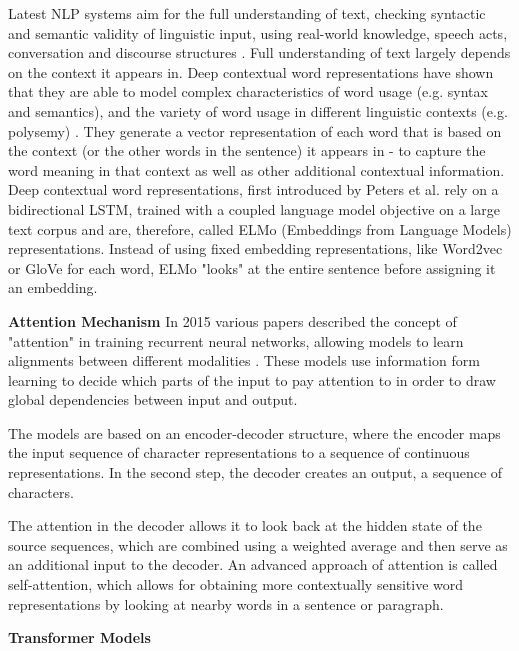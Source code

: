 Latest NLP systems aim for the full understanding of text, checking syntactic and semantic validity of linguistic input, using real-world knowledge, speech acts, conversation and discourse structures \cite{kumar2011natural}.
Full understanding of text largely depends on the context it appears in. 
Deep contextual word representations have shown that they are able to model complex characteristics of word usage (e.g. syntax and semantics), and the variety of word usage in different linguistic contexts (e.g. polysemy) \cite{peters2018deep}. They generate a vector representation of each word that is based on the context (or the other words in the sentence) it appears in - to capture the word meaning in that context as well as other additional contextual information. Deep contextual word representations, first introduced by Peters et al. rely on a bidirectional LSTM, trained with a coupled language model objective on a large text corpus and are, therefore, called ELMo (Embeddings from Language Models) representations.
Instead of using fixed embedding representations, like Word2vec or GloVe \cite{pennington2014glove} for each word, ELMo "looks" at the entire sentence before assigning it an embedding. 

\textbf{Attention Mechanism}
    \label{sec:attention}
In 2015 various papers described the concept of "attention" in training recurrent neural networks, allowing models to learn alignments between different modalities \cite{}. These models use information form learning to decide which parts of the input to pay attention to in order to draw global dependencies between input and output. 

The models are based on an encoder-decoder structure, where the encoder maps the input sequence of character representations to a sequence of continuous representations. In the second step, the decoder creates an output, a sequence of characters. 

The attention in the decoder allows it to look back at the hidden state of the source sequences, which are combined using a weighted average and then serve as an additional input to the decoder. 
An advanced approach of attention is called self-attention, which allows for obtaining more contextually sensitive word representations by looking at nearby words in a sentence or paragraph.

\textbf{Transformer Models}
    \label{sec:transformers}

